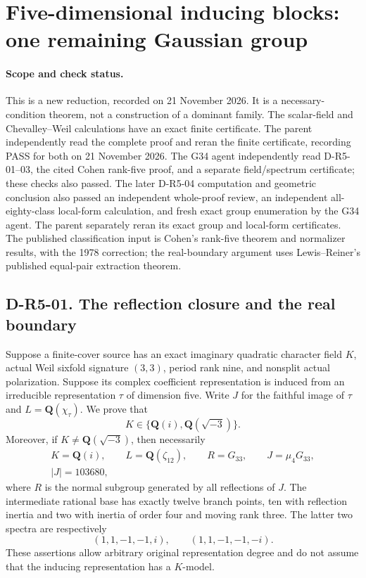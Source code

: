 \section{Five-dimensional inducing blocks: one remaining Gaussian group}
\label{sec:rank-five-inducing}

\paragraph{Scope and check status.}
This is a new reduction, recorded on 21 November 2026.  It is a
necessary-condition theorem, not a construction of a dominant family.
The scalar-field and Chevalley--Weil calculations have an exact finite
certificate.  The parent independently read the complete proof and
reran the finite certificate, recording PASS for both on 21 November
2026.  The G34 agent independently read D-R5-01--03, the cited
Cohen rank-five proof, and a separate field/spectrum certificate;
these checks also passed.  The later D-R5-04 computation and
geometric conclusion also passed an independent whole-proof review,
an independent all-eighty-class local-form calculation, and fresh
exact group enumeration by the G34 agent.  The parent separately
reran its exact group and local-form certificates.
The published classification input is Cohen's rank-five theorem and
normalizer results, with the 1978 correction; the real-boundary argument
uses Lewis--Reiner's published equal-pair extraction theorem.

\subsection*{D-R5-01. The reflection closure and the real boundary}

Suppose a finite-cover source has an exact imaginary quadratic character
field $K$, actual Weil sixfold signature $(3,3)$, period rank nine,
and nonsplit actual polarization.  Suppose its complex coefficient
representation is induced from an irreducible representation $\tau$
of dimension five.  Write $J$ for the faithful image of $\tau$ and
$L=\mathbf Q(\chi_\tau)$.  We prove that
\[
                         K\in\{\mathbf Q(i),\mathbf Q(\sqrt{-3})\}.
                                                               \tag{R5.1}
\]
Moreover, if $K\ne\mathbf Q(\sqrt{-3})$, then necessarily
\[
 \begin{gathered}
 K=\mathbf Q(i),\qquad L=\mathbf Q(\zeta_{12}),\qquad
 R=G_{33},\qquad J=\mu_4G_{33},\\
 |J|=103680,
 \end{gathered}                                                  \tag{R5.2}
\]
where $R$ is the normal subgroup generated by all reflections of $J$.
The intermediate rational base has exactly twelve branch points,
ten with reflection inertia and two with inertia of order four and
moving rank three.  The latter two spectra are respectively
\[
                 (1,1,-1,-1,i),\qquad(1,1,-1,-1,-i).
                                                               \tag{R5.3}
\]
These assertions allow arbitrary original representation degree and
do not assume that the inducing representation has a $K$-model.

